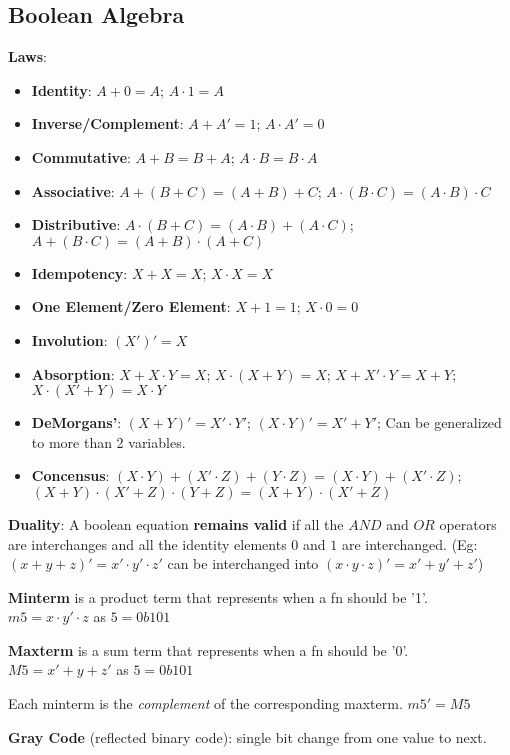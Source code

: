 \documentclass[a4paper,landscape]{article}
\newcommand{\rntopic}[1]{\vspace{-2.0em}\subsection*{#1}\vspace{-1.0em}}
\newcommand{\rnname}[1]{\textbf{#1}}
\begin{document}
\begin{multicols*}{4}
\rntopic{Boolean Algebra}
\begin{flatitemize}
\item \rnname{Laws}:
\vspace{-0.5em}
\begin{itemize}
\item \textbf{Identity}: $A+0 = A$; $A \cdot 1 = A$
\item \textbf{Inverse/Complement}: $A+A' = 1$; $A \cdot A' = 0$
\item \textbf{Commutative}: $A+B=B+A$; $A \cdot B = B \cdot A$
\item \textbf{Associative}: $A + (B+C) = (A+B) + C$; $A \cdot (B \cdot C) = (A \cdot B) \cdot C$
\item \textbf{Distributive}: $A \cdot (B + C) = (A \cdot B) + (A \cdot C)$; $A + (B \cdot C) = (A + B) \cdot (A + C)$
\item \textbf{Idempotency}: $X + X = X$; $X \cdot X = X$
\item \textbf{One Element/Zero Element}: $X + 1 = 1$; $X \cdot 0 = 0$
\item \textbf{Involution}: $(X')' = X$
\item \textbf{Absorption}: $X + X \cdot Y = X$; $X \cdot(X + Y) = X$; $X + X' \cdot Y = X + Y$; $X \cdot (X' + Y) = X \cdot Y$
\item \textbf{DeMorgans'}: $(X + Y)' = X' \cdot Y'$; $(X \cdot Y)' = X' + Y'$; Can be generalized to more than 2 variables.
\item \textbf{Concensus}: $(X \cdot Y) + (X' \cdot Z) + (Y \cdot Z) = (X \cdot Y) + (X' \cdot Z)$; $(X + Y) \cdot (X' + Z) \cdot (Y + Z) = (X + Y) \cdot (X' + Z)$
\end{itemize}
\vspace{-0.5em}
\item \rnname{Duality}: A boolean equation \textbf{remains valid} if all the $AND$ and $OR$ operators are interchanges and all the identity elements $0$ and $1$ are interchanged. (Eg: $(x + y + z)' = x' \cdot y' \cdot z'$ can be interchanged into $(x \cdot y \cdot z)' = x' + y' + z'$)

\item \rnname{Minterm} is a product term that represents when a fn should be '1'. $m5 = x\cdot y' \cdot z$ as $5 = 0b101$
\item \rnname{Maxterm} is a sum term that represents when a fn should be '0'. $M5 = x' + y + z'$ as $5 = 0b101$
\item Each minterm is the \textit{complement} of the corresponding maxterm. $m5' = M5$
\iffalse
\vspace{-1em}
\begin{figure}[H]
  \texttt{[image: minterm\_maxterm.PNG]}
\end{figure}
\vspace{-1.5em}
\fi
\item \rnname{Gray Code} (reflected binary code): single bit change from one value to next.
\end{flatitemize}


\end{multicols*}
\end{document}
